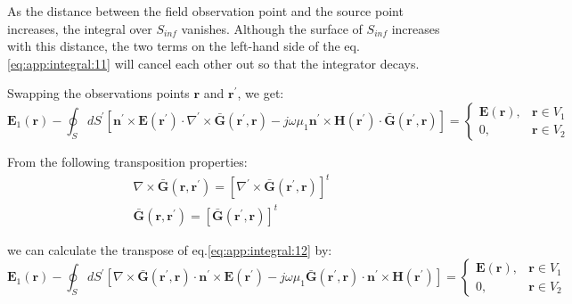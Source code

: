 		As the distance between the field observation point and the source point increases, the integral over $S_{inf}$ vanishes. Although the surface of $S_ {inf}$ increases with this distance, the two terms on the left-hand side of the eq.\eqref{eq:app:integral:11} will cancel each other out so that the integrator decays.

		Swapping the observations points $\mathbf{r}$ and $\mathbf{r^\prime}$, we get:
		\begin{equation}
			\mathbf{E}_1(\mathbf{r}) - \oint_S dS^\prime  \left[\mathbf{n^\prime}\times\mathbf{E}(\mathbf{r^\prime})\cdot\nabla^\prime\times\mathbf{\bar{G}}(\mathbf{r^\prime},\mathbf{r}) -j\omega\mu_1\mathbf{n^\prime}\times\mathbf{H}(\mathbf{r^\prime})\cdot\mathbf{\bar{G}}(\mathbf{r^\prime},\mathbf{r})\right] = \begin{cases}
				\mathbf{E}(\mathbf{r}), &\mathbf{r}\in V_1 \\
				0, &\mathbf{r}\in V_2
			\end{cases} \label{eq:app:integral:12}
		\end{equation}

		From the following transposition properties:
		\begin{eqnarray}
			\nabla\times\mathbf{\bar{G}}(\mathbf{r},\mathbf{r^\prime}) = \left[\nabla^\prime\times\mathbf{\bar{G}}(\mathbf{r^\prime},\mathbf{r})\right]^t \label{eq:app:integral:13} \\
			\mathbf{\bar{G}}(\mathbf{r},\mathbf{r^\prime}) = \left[\mathbf{\bar{G}}(\mathbf{r^\prime},\mathbf{r})\right]^t \label{eq:app:integral:14}
		\end{eqnarray}

		\noindent we can calculate the transpose of eq.\eqref{eq:app:integral:12} by:
		\begin{equation}
			 \mathbf{E}_1(\mathbf{r}) - \oint_S dS^\prime  \left[\nabla\times\mathbf{\bar{G}}(\mathbf{r^\prime},\mathbf{r})\cdot\mathbf{n^\prime}\times\mathbf{E}(\mathbf{r^\prime}) -j\omega\mu_1\mathbf{\bar{G}}(\mathbf{r^\prime},\mathbf{r})\cdot\mathbf{n^\prime}\times\mathbf{H}(\mathbf{r^\prime})\right] = \begin{cases}
				\mathbf{E}(\mathbf{r}), &\mathbf{r}\in V_1 \\
				0, &\mathbf{r}\in V_2
			\end{cases} \label{eq:app:integral:15}
		\end{equation}

